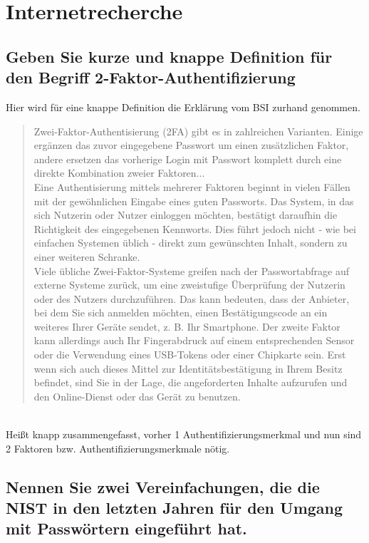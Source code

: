 \section{Internetrecherche}
\subsection{Geben Sie kurze und knappe Definition für den Begriff 2-Faktor-Authentifizierung}
Hier wird für eine knappe Definition die Erklärung vom BSI zurhand genommen.
\begin{quote}
 Zwei-Faktor-Authentisierung (2FA) gibt es in zahlreichen Varianten. Einige ergänzen das zuvor eingegebene Passwort um einen zusätzlichen Faktor, andere ersetzen das vorherige Login mit Passwort komplett durch eine direkte Kombination zweier Faktoren...\\
Eine Authentisierung mittels mehrerer Faktoren beginnt in vielen Fällen mit der gewöhnlichen Eingabe eines guten Passworts. Das System, in das sich Nutzerin oder Nutzer einloggen möchten, bestätigt daraufhin die Richtigkeit des eingegebenen Kennworts. Dies führt jedoch nicht - wie bei einfachen Systemen üblich - direkt zum gewünschten Inhalt, sondern zu einer weiteren Schranke.\\
Viele übliche Zwei-Faktor-Systeme greifen nach der Passwortabfrage auf externe Systeme zurück, um eine zweistufige Überprüfung der Nutzerin oder des Nutzers durchzuführen. Das kann bedeuten, dass der Anbieter, bei dem Sie sich anmelden möchten, einen Bestätigungscode an ein weiteres Ihrer Geräte sendet, z. B. Ihr Smartphone. Der zweite Faktor kann allerdings auch Ihr Fingerabdruck auf einem entsprechenden Sensor oder die Verwendung eines USB-Tokens oder einer Chipkarte sein. Erst wenn sich auch dieses Mittel zur Identitätsbestätigung in Ihrem Besitz befindet, sind Sie in der Lage, die angeforderten Inhalte aufzurufen und den Online-Dienst oder das Gerät zu benutzen.
\end{quote}
\cite{bsi_2fa}\\
Heißt knapp zusammengefasst, vorher 1 Authentifizierungsmerkmal und nun sind 2 Faktoren bzw. Authentifizierungsmerkmale nötig.
\clearpage
\subsection{Nennen Sie zwei Vereinfachungen, die die NIST in den letzten Jahren für den Umgang mit Passwörtern eingeführt hat.}

